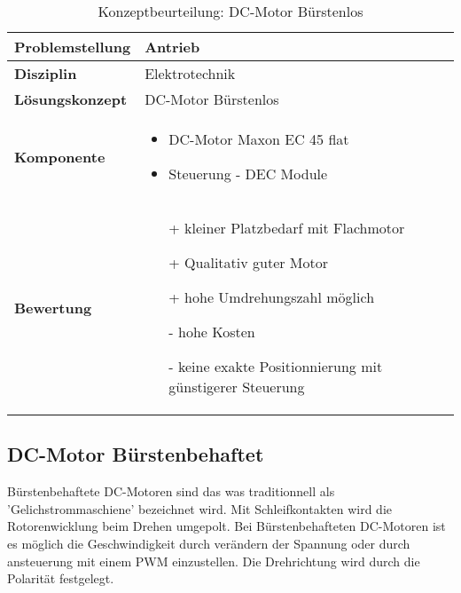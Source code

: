 \documentclass[../../main.tex]{subfiles}
\begin{document}
    \begin{flushleft}
        \begin{table}[H]
        \begin{tabular}{ | l | p{11cm} |}
        \hline
        \textbf{Problemstellung} & Antrieb \\ \hline
        \textbf{Disziplin} & Elektrotechnik \\ \hline
        \textbf{Lösungskonzept} & DC-Motor Bürstenlos\\ \hline
        \textbf{Komponente} & \begin{itemize}
            \item DC-Motor Maxon EC 45 flat
            \item Steuerung - DEC Module
            \end{itemize}\\ \hline
        \textbf{Bewertung} &  \begin{itemize}
                                \item[+] kleiner Platzbedarf mit Flachmotor
                                \item[+] Qualitativ guter Motor
                                \item[+] hohe Umdrehungszahl möglich 
                                \item[-] hohe Kosten 
                                \item[-] keine exakte Positionnierung mit günstigerer Steuerung
                              \end{itemize} \\ \hline
        \end{tabular}
        \caption{Konzeptbeurteilung: DC-Motor Bürstenlos}
        \label{tab:antr_konzept_dcMotor_buerstenlos}
    \end{table}
    \end{flushleft}

    \subsection{DC-Motor Bürstenbehaftet}
    
    Bürstenbehaftete DC-Motoren sind das was traditionnell als 'Gelichstrommaschiene' bezeichnet wird. Mit Schleifkontakten wird die Rotorenwicklung beim Drehen umgepolt.
    Bei Bürstenbehafteten DC-Motoren ist es möglich die Geschwindigkeit durch verändern der Spannung oder durch ansteuerung mit einem PWM einzustellen. Die Drehrichtung wird durch die Polarität festgelegt.
\end{document}
